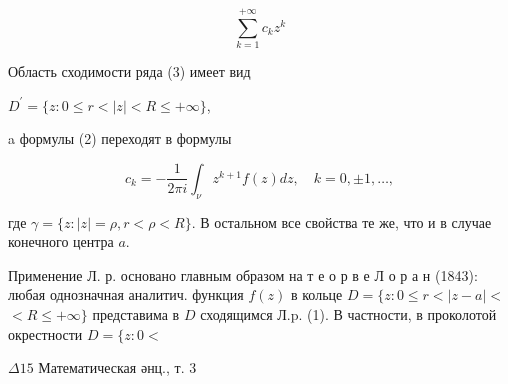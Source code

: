 \documentclass[10pt]{article}
\begin{document}
\[

\sum_{k=1}^{+\infty} c_{k} z^{k}

\]



Область сходимости ряда (3) имеет вид



$D^{\prime}=\{z: 0 \leqslant r<|z|<R \leqslant+\infty\}$,



a формулы (2) переходят в формулы



\[

c_{k}=-\frac{1}{2 \pi i} \int_{\nu} z^{k+1} f(z) d z, \quad k=0, \pm 1, \ldots,

\]



где $\gamma=\{z:|z|=\rho, r<\rho<R\}$. В остальном все свойства те же, что и в случае конечного центра $a$.



Применение Л. р. основано главным образом на т е о р в е Л о р а н (1843): любая однозначная аналитич. функция $f(z)$ в кольце $D=\{z: 0 \leqslant r<|z-a|<$ $<R \leqslant+\infty\}$ представима в $D$ сходящимся Л.p. (1). В частности, в проколотой окрестности $D=\{z: 0<$



$\Delta 15$ Математическая әнц., т. 3
\end{document}
